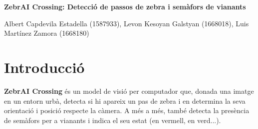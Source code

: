 \documentclass[10pt,a4paper,twocolumn,twoside]{article}
\begin{document}
{\sffamily
\noindent\textbf{\LARGE ZebrAI Crossing: Detecció de passos de zebra i semàfors de vianants}
\begin{center}
Albert Capdevila Estadella (1587933), Levon Kesoyan Galstyan (1668018), Luis Martínez Zamora (1668180)
\end{center}

%
%
%
%
}

%


\section{Introducció}


\textbf{ZebrAI Crossing} és un model de visió per computador que, donada una imatge en un entorn urbà, detecta si hi apareix un pas de zebra i en determina la seva orientació i posició respecte la càmera. A més a més, també detecta la presència de semàfors per a vianants i indica el seu estat (en vermell, en verd...).
\end{document}

